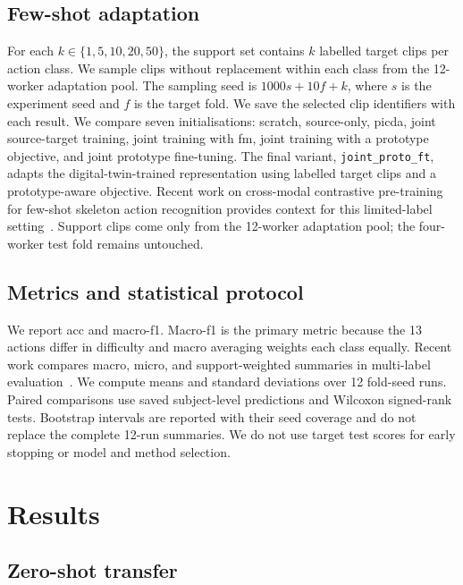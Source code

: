 \documentclass[3p,times,procedia]{elsarticle}
\begin{document}
\subsection{Few-shot adaptation}

For each $k\in\{1,5,10,20,50\}$, the support set contains $k$ labelled target
clips per action class. We sample clips without replacement within each class
from the 12-worker adaptation pool. The sampling seed is $1000s+10f+k$, where
$s$ is the experiment seed and $f$ is the target fold. We save the selected clip
identifiers with each result. We compare seven initialisations: scratch,
source-only, \ac{picda}, joint source-target training, joint training with
\ac{fm}, joint training with a prototype objective, and joint prototype
fine-tuning. The final variant, \texttt{joint\_proto\_ft}, adapts the
digital-twin-trained representation using labelled target clips and a
prototype-aware objective. Recent work on cross-modal contrastive pre-training
for few-shot skeleton action recognition provides context for this
limited-label setting~\cite{lu2024crossmodalfewshot}. Support clips come only
from the 12-worker adaptation pool; the four-worker test fold remains untouched.

\subsection{Metrics and statistical protocol}

We report \ac{acc} and macro-\acs{f1}. Macro-\acs{f1} is the primary metric
because the 13 actions differ in difficulty and macro averaging weights each
class equally. Recent work compares macro, micro, and support-weighted
summaries in multi-label evaluation~\cite{lee2024f1metrics}. We compute means
and standard deviations over 12 fold-seed runs. Paired comparisons use saved
subject-level predictions and Wilcoxon signed-rank tests. Bootstrap intervals
are reported with their seed coverage and do not replace the complete 12-run
summaries. We do not use target test scores for early stopping or model and
method selection.

\section{Results}
\label{sec:results}

\subsection{Zero-shot transfer}
\end{document}
